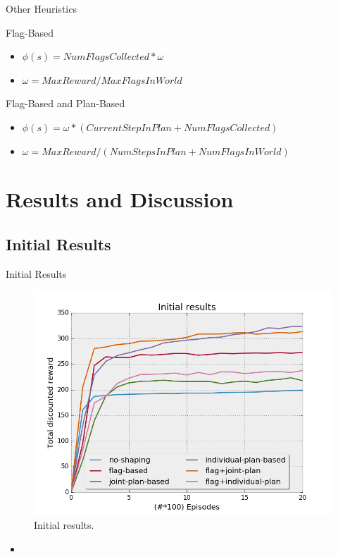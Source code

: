 \documentclass{bredelebeamer}
\begin{document}
\begin{frame}{Other Heuristics}

\begin{block}{Flag-Based}
\begin{itemize}
\item $\phi (s) =  NumFlagsCollected*\omega$
\item $\omega = MaxReward/MaxFlagsInWorld$
\end{itemize}
\end{block}

\begin{block}{Flag-Based and Plan-Based}
\begin{itemize}
\item $\phi (s) = \omega * (CurrentStepInPlan + NumFlagsCollected)$
\item $\omega = MaxReward/(NumStepsInPlan + NumFlagsInWorld)$
\end{itemize}
\end{block}

\end{frame}


\section{Results and Discussion}

\subsection{Initial Results}
\begin{frame}{Initial Results}

\begin{figure}[h!]
  \includegraphics[height=0.4\textheight]{../article/img/initial.png}
  \caption{Initial results.}
  \label{fig:results1}
\end{figure}

\begin{block}{}
\begin{itemize}
\item 
\end{itemize}
\end{block}

\end{frame}
\end{document}
